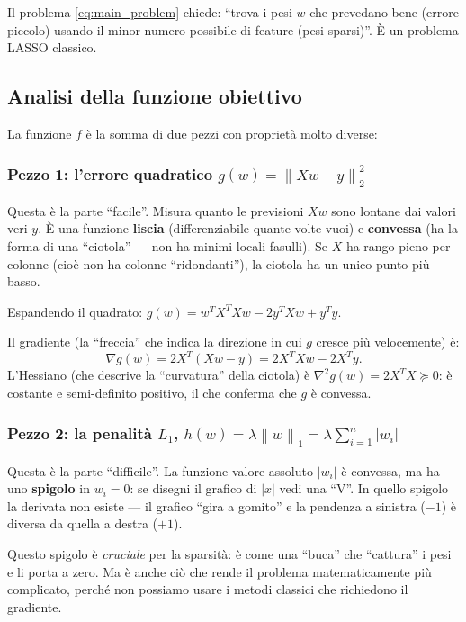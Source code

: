 \documentclass[a4paper,11pt]{article}
\theoremstyle{definition}
\newcommand{\norm}[1]{\left\lVert #1 \right\rVert}
\begin{document}
\begin{riassunto}
Il problema \eqref{eq:main_problem} chiede: ``trova i pesi $w$ che prevedano bene (errore piccolo) usando il minor numero possibile di feature (pesi sparsi)''. È un problema LASSO classico.
\end{riassunto}

\subsection{Analisi della funzione obiettivo}
\label{subsec:analisi_f}

La funzione $f$ è la somma di due pezzi con proprietà molto diverse:

\subsubsection*{Pezzo 1: l'errore quadratico $g(w) = \norm{Xw-y}_2^2$}

\begin{intuizione}
Questa è la parte ``facile''. Misura quanto le previsioni $Xw$ sono lontane dai valori veri $y$. È una funzione \textbf{liscia} (differenziabile quante volte vuoi) e \textbf{convessa} (ha la forma di una ``ciotola'' --- non ha minimi locali fasulli). Se $X$ ha rango pieno per colonne (cioè non ha colonne ``ridondanti''), la ciotola ha un unico punto più basso.
\end{intuizione}

Espandendo il quadrato: $g(w) = w^T X^T X w - 2y^T X w + y^T y$.

Il gradiente (la ``freccia'' che indica la direzione in cui $g$ cresce più velocemente) è:
\[
  \nabla g(w) = 2X^T(Xw - y) = 2X^T X w - 2X^T y.
\]
L'Hessiano (che descrive la ``curvatura'' della ciotola) è $\nabla^2 g(w) = 2X^T X \succeq 0$: è costante e semi-definito positivo, il che conferma che $g$ è convessa.

\subsubsection*{Pezzo 2: la penalità $L_1$, $h(w) = \lambda\norm{w}_1 = \lambda\sum_{i=1}^n |w_i|$}

\begin{intuizione}
Questa è la parte ``difficile''. La funzione valore assoluto $|w_i|$ è convessa, ma ha uno \textbf{spigolo} in $w_i = 0$: se disegni il grafico di $|x|$ vedi una ``V''. In quello spigolo la derivata non esiste --- il grafico ``gira a gomito'' e la pendenza a sinistra ($-1$) è diversa da quella a destra ($+1$).

Questo spigolo è \emph{cruciale} per la sparsità: è come una ``buca'' che ``cattura'' i pesi e li porta a zero. Ma è anche ciò che rende il problema matematicamente più complicato, perché non possiamo usare i metodi classici che richiedono il gradiente.
\end{intuizione}
\end{document}
